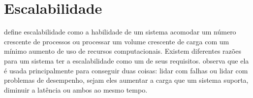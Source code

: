 




\section{Escalabilidade}
\label{sec:scalability}

\cite{Bondi:2000:CSI:350391.350432} define escalabilidade como a habilidade de um sistema acomodar um número crescente de processos ou processar um volume crescente de carga com um mínimo aumento de uso de recursos computacionais.
Existem diferentes razões para um sistema ter a escalabilidade como um de seus requisitos. \cite{Newman:2015:BM:2904388} observa que ela é usada principalmente para conseguir duas coisas: lidar com falhas ou lidar com problemas de desempenho, sejam eles aumentar a carga que um sistema suporta, diminuir a latência ou ambos ao mesmo tempo. 


